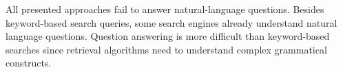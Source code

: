 All presented approaches fail to answer natural-language questions.
Besides keyword-based search queries, some search engines already understand natural language questions. Question answering is more difficult than keyword-based searches since retrieval algorithms need to understand complex grammatical constructs.

